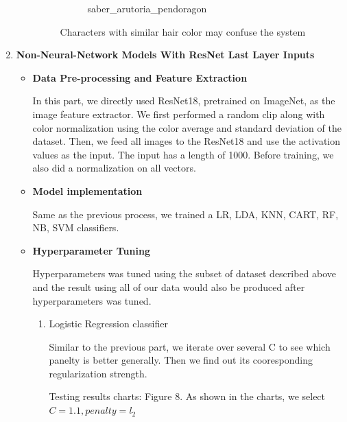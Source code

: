 \documentclass[11.5pt]{article}
\begin{document}
\begin{enumerate}
\begin{itemize}
\begin{figure}[h!]
\begin{subfigure}[b]{0.5\linewidth}
                    \caption{saber\_arutoria\_pendoragon}
                \end{subfigure}
                \caption{Characters with similar hair color may confuse the system}
            \end{figure}
        \end{itemize}
        \item \textbf{Non-Neural-Network Models With ResNet Last Layer Inputs}
        \begin{itemize}
            \item \textbf{Data Pre-processing and Feature Extraction}

            In this part, we directly used ResNet18, pretrained on ImageNet, as the image feature extractor. We first performed a random clip along with color normalization using the color average and standard deviation of the dataset. Then, we feed all images to the ResNet18 and use the activation values as the input. The input has a length of 1000. Before training, we also did a normalization on all vectors.
            \item \textbf{Model implementation}

            Same as the previous process, we trained a LR, LDA, KNN, CART, RF, NB, SVM classifiers.
            \item \textbf{Hyperparameter Tuning}
            
            Hyperparameters was tuned using the subset of dataset described above and the result using all of our data would also be produced after hyperparameters was tuned.
            \begin{enumerate}
                \item Logistic Regression classifier

                Similar to the previous part, we iterate over several C to see which panelty is better generally. Then we find out its cooresponding regularization strength. 

                Testing results charts: Figure 8. As shown in the charts, we select $C = 1.1, penalty = l_2$ 


\end{enumerate}
\end{itemize}
\end{enumerate}
\end{document}
